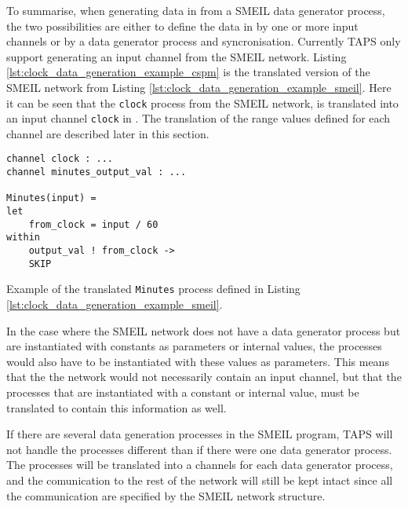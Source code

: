 To summarise, when generating data in \cspm{} from a SMEIL data generator process, the two possibilities are either to define the data in \cspm by one or more input channels or by a data generator process and syncronisation.
Currently TAPS only support generating an input channel from the SMEIL network.
Listing \ref{lst:clock_data_generation_example_cspm} is the translated version of the SMEIL network from Listing \ref{lst:clock_data_generation_example_smeil}. Here it can be seen that the \texttt{clock} process from the SMEIL network, is translated into an input channel \texttt{clock} in \cspm{}.
The translation of the range values defined for each channel are described later in this section.
\begin{listing}
\begin{verbatim}
channel clock : ...
channel minutes_output_val : ...

Minutes(input) =
let
    from_clock = input / 60
within
    output_val ! from_clock ->
    SKIP

\end{verbatim}
\caption{Example of the translated \texttt{Minutes} process defined in Listing \ref{lst:clock_data_generation_example_smeil}.}
\label{lst:clock_data_generation_example_cspm}
\end{listing}
In the case where the SMEIL network does not have a data generator process but are instantiated with constants as parameters or internal values, the \cspm processes would also have to be instantiated with these values as parameters. This means that the the \cspm{} network would not necessarily contain an input channel, but that the processes that are instantiated with a constant or internal value, must be translated to contain this information as well.

If there are several data generation processes in the SMEIL program, TAPS will not handle the processes different than if there were one data generator process. The processes will be translated into a \cspm channels for each data generator process, and the comunication to the rest of the network will still be kept intact since all the communication are specified by the SMEIL network structure.


